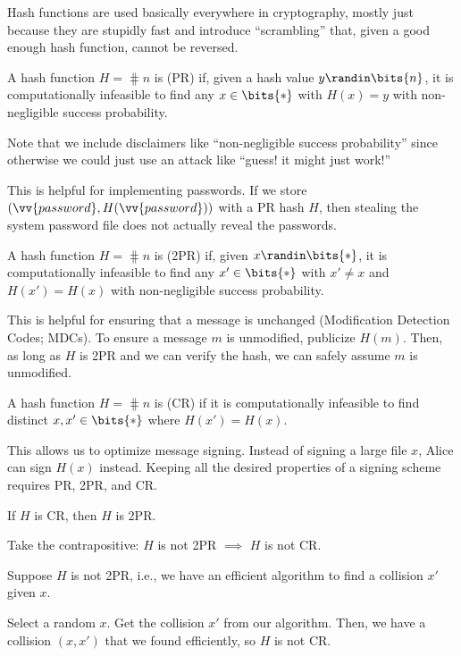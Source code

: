 \documentclass[class=co487,tikz,minted,notes]{agony}
\begin{document}
Hash functions are used basically everywhere in cryptography,
mostly just because they are stupidly fast and introduce ``scrambling'' that,
given a good enough hash function, cannot be reversed.

\begin{defn}
  A hash function $H = \hash{n}$ is  (PR) if,
  given a hash value $y \randin \bits{n}$, it is computationally infeasible
  to find any $x \in \bits{*}$ with $H(x) = y$ with non-negligible success probability.
\end{defn}

Note that we include disclaimers like ``non-negligible success probability''
since otherwise we could just use an attack like ``guess! it might just work!''

This is helpful for implementing passwords.
If we store $(\vv{password}, H(\vv{password}))$ with a PR hash $H$,
then stealing the system password file does not actually reveal the passwords.

\begin{defn}
  A hash function $H = \hash{n}$ is  (2PR) if,
  given $x \randin \bits{*}$, it is computationally infeasible to find
  any $x' \in \bits{*}$ with $x' \neq x$ and $H(x') = H(x)$ with non-negligible success probability.
\end{defn}

This is helpful for ensuring that a message is unchanged
(Modification Detection Codes; MDCs).
To ensure a message $m$ is unmodified, publicize $H(m)$.
Then, as long as $H$ is 2PR and we can verify the hash,
we can safely assume $m$ is unmodified.

\begin{defn}
  A hash function $H = \hash{n}$ is  (CR)
  if it is computationally infeasible to find distinct $x,x' \in \bits{*}$
  where $H(x') = H(x)$.
\end{defn}

This allows us to optimize message signing.
Instead of signing a large file $x$, Alice can sign $H(x)$ instead.
Keeping all the desired properties of a signing scheme
requires PR, 2PR, and CR.


\begin{prop}
  If $H$ is CR, then $H$ is 2PR.
\end{prop}
\begin{prf}
  Take the contrapositive: $H$ is not 2PR $\implies$ $H$ is not CR.

  Suppose $H$ is not 2PR, i.e., we have an efficient algorithm
  to find a collision $x'$ given $x$.

  Select a random $x$. Get the collision $x'$ from our algorithm.
  Then, we have a collision $(x,x')$ that we found efficiently,
  so $H$ is not CR.
\end{prf}
\end{document}
